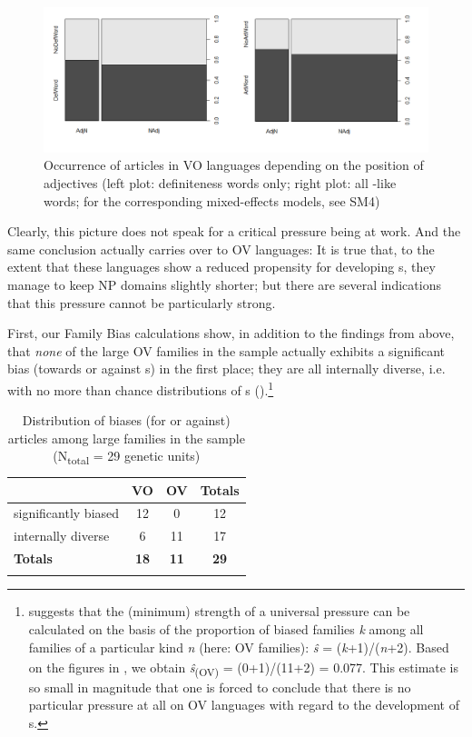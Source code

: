 \documentclass[output=paper]{langsci/langscibook}
\begin{document}
  

\begin{figure}
\includegraphics[width=\textwidth]{figures/schmidtkebode-img4.png}
\caption{Occurrence of articles in VO languages depending on the position of adjectives (left plot: definiteness words only; right plot: all -like words; for the corresponding mixed-effects models, see SM4)}
\label{fig:ksb:4}
\end{figure}

Clearly, this picture does not speak for a critical  pressure being at work. And the same conclusion actually carries over to OV languages: It is true that, to the extent that these languages show a reduced propensity for developing s, they manage to keep NP  domains slightly shorter; but there are several indications that this pressure cannot be particularly strong. 

First, our Family Bias calculations show, in addition to the findings from above, that \textit{none} of the large OV families in the sample actually exhibits a significant bias (towards or against s) in the first place; they are all internally diverse, i.e. with no more than chance distributions of s ().\footnote{\citet{Bickel2013_Fam} suggests that the (minimum) strength of a universal pressure can be calculated on the basis of the proportion of biased families \textit{k} among all families of a particular kind \textit{n} (here: OV families): \textit{\^s}\textsubscript{} =\textsubscript{} (\textit{k}+1)/(\textit{n}+2). Based on the figures in , we obtain \textit{\^s}\textsubscript{(OV)} = (0+1)/(11+2) = 0.077. This estimate is so small in magnitude that one is forced to conclude that there is no particular pressure at all on OV languages with regard to the development of s.} 

\begin{table}
\begin{tabularx}{.8\textwidth}{lSSS}
\lsptoprule
& VO & OV &  Totals\\
\midrule
significantly biased & 12 & 0 & 12\\
internally diverse & 6 & 11 & 17\\
\midrule
\textbf{Totals} & \textbf{18} & \textbf{11} & \textbf{29}\\
\lspbottomrule
\end{tabularx}
\caption{Distribution of biases (for or against) articles among large families in the sample (N\textsubscript{total} = 29 genetic units)}
\label{tab:ksb:4}
\end{table}
\end{document}
